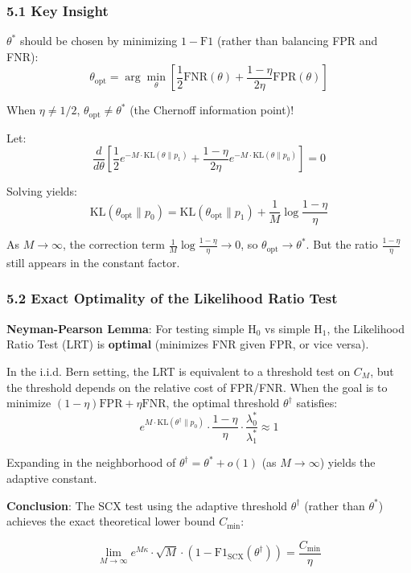 \documentclass[
  12pt,
]{ctexart}
\begin{document}
\subsubsection{5.1 Key Insight}\label{key-insight}

\(\theta^*\) should be chosen by minimizing \(1 - \text{F1}\) (rather than balancing FPR and FNR):
\[\theta_{\text{opt}} = \arg\min_{\theta} \left[\frac{1}{2}\text{FNR}(\theta) + \frac{1-\eta}{2\eta}\text{FPR}(\theta)\right]\]

When \(\eta \neq 1/2\), \(\theta_{\text{opt}} \neq \theta^*\) (the Chernoff information point)!

Let:
\[\frac{d}{d\theta}\left[\frac{1}{2}e^{-M \cdot \text{KL}(\theta \| p_1)} + \frac{1-\eta}{2\eta}e^{-M \cdot \text{KL}(\theta \| p_0)}\right] = 0\]

Solving yields:
\[\text{KL}(\theta_{\text{opt}} \| p_0) = \text{KL}(\theta_{\text{opt}} \| p_1) + \frac{1}{M}\log\frac{1-\eta}{\eta}\]

As \(M \to \infty\), the correction term \(\frac{1}{M}\log\frac{1-\eta}{\eta} \to 0\), so \(\theta_{\text{opt}} \to \theta^*\). But the ratio \(\frac{1-\eta}{\eta}\) still appears in the constant factor.

\subsubsection{5.2 Exact Optimality of the Likelihood Ratio Test}\label{exact-optimality-of-the-likelihood-ratio-test}

\textbf{Neyman-Pearson Lemma}: For testing simple H\(_0\) vs simple H\(_1\), the Likelihood Ratio Test (LRT) is \textbf{optimal} (minimizes FNR given FPR, or vice versa).

In the i.i.d. Bern setting, the LRT is equivalent to a threshold test on \(C_M\), but the threshold depends on the relative cost of FPR/FNR. When the goal is to minimize \((1-\eta)\text{FPR} + \eta\text{FNR}\), the optimal threshold \(\theta^\dagger\) satisfies:
\[e^{M \cdot \text{KL}(\theta^\dagger \| p_0)} \cdot \frac{1-\eta}{\eta} \cdot \frac{\lambda_0^*}{\lambda_1^*} \approx 1\]

Expanding in the neighborhood of \(\theta^\dagger = \theta^* + o(1)\) (as \(M\to\infty\)) yields the adaptive constant.

\textbf{Conclusion}: The SCX test using the adaptive threshold \(\theta^\dagger\) (rather than \(\theta^*\)) achieves the exact theoretical lower bound \(C_{\min}\):

\[\boxed{\lim_{M\to\infty} e^{M\kappa} \cdot \sqrt{M} \cdot (1 - \text{F1}_{\text{SCX}}(\theta^\dagger)) = \frac{C_{\min}}{\eta}}\]
\end{document}
